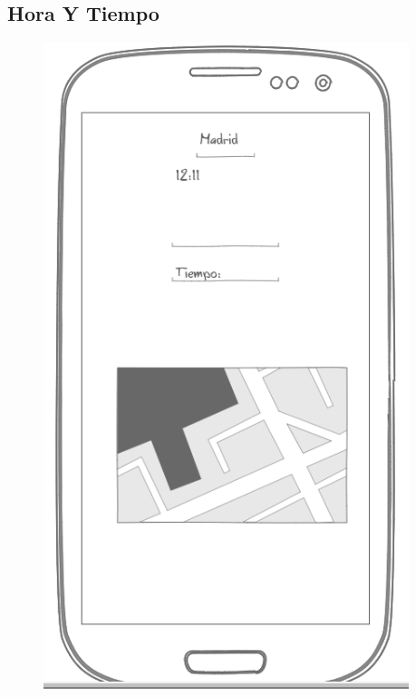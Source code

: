 \documentclass[letterpaper,twocolumn,openany,nodeprecatedcode,dvipsnames,nomultitoc]{dndbook}
\begin{document}
\begin{justify}
\subsection{Hora Y Tiempo}
\begin{figure}[H]
\centering
\includegraphics[scale = 0.2]{Manual/img/Hora Y Tiempo.png}
\end{figure}

\end{justify}
\end{document}
